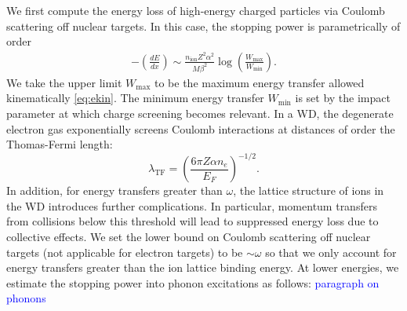 \documentclass[twocolumn,showpacs,preprintnumbers,amsmath,amssymb,prd]{revtex4}
\def\r{\right)}
\def\l{\left(}
\begin{document}
\begin{appendices}
We first compute the energy loss of high-energy charged particles via Coulomb scattering off nuclear targets. 
In this case, the stopping power is parametrically of order
\begin{align}
\label{eq:SP}
-  \l \frac{dE}{dx}\r \sim \frac{n_\text{ion} Z^2 \alpha^2}{M \beta^2} \log {\l\frac{W_{\text{max}}}{W_{\text{min}}}\r}.
\end{align}
We take the upper limit $W_\text{max}$ to be the maximum energy transfer allowed kinematically \eqref{eq:ekin}. 
The minimum energy transfer $W_\text{min}$ is set by the impact parameter at which charge screening becomes relevant. 
In a WD, the degenerate electron gas exponentially screens Coulomb interactions at distances of order the Thomas-Fermi length:
\begin{equation}
\label{eq:TF}
\lambda_{\text{TF}} = \l \frac{6 \pi Z \alpha n_e}{E_F}\r^{-1/2}.
\end{equation}
In addition, for energy transfers greater than $\omega$, the lattice structure of ions in the WD introduces further complications.
In particular, momentum transfers from collisions below this threshold will lead to suppressed energy loss due to collective effects.
We set the lower bound on Coulomb scattering off nuclear targets (not applicable for electron targets) to be $\sim \omega$ so that we only account for energy transfers greater than the ion lattice binding energy.
At lower energies, we estimate the stopping power into phonon excitations as follows: \textcolor{blue}{paragraph on phonons}


\end{appendices}
\end{document}
